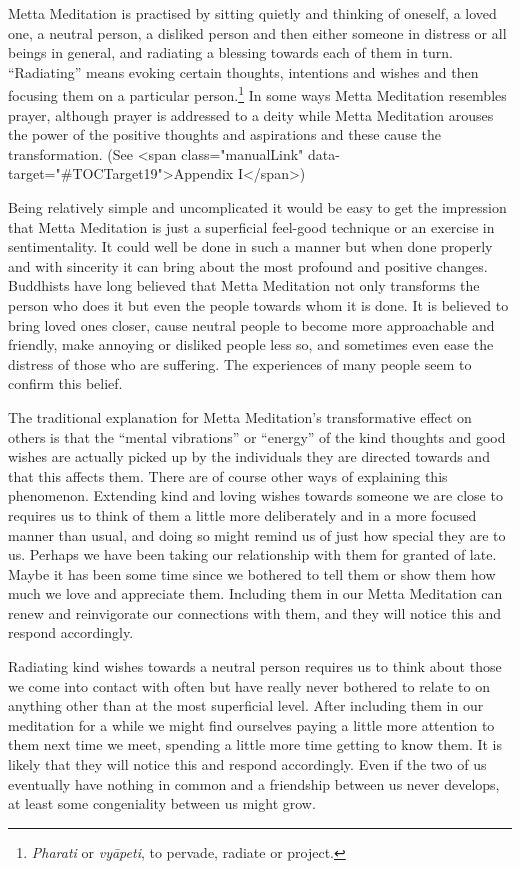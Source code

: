\documentclass[10pt, openright]{book}
\begin{document}
Metta Meditation is practised by sitting quietly and thinking of oneself, a loved one, a neutral person, a disliked person and then either someone in distress or all beings in general, and radiating a blessing towards each of them in turn. “Radiating” means evoking certain thoughts, intentions and wishes and then focusing them on a particular person.\footnote {\textit{Pharati} or \textit{vyāpeti}, to pervade, radiate or project.} In some ways Metta Meditation resembles prayer, although prayer is addressed to a deity while Metta Meditation arouses the power of the positive thoughts and aspirations and these cause the transformation. (See <span class="manualLink" data-target="#TOCTarget19">Appendix I</span>)


Being relatively simple and uncomplicated it would be easy to get the impression that Metta Meditation is just a superficial feel-good technique or an exercise in sentimentality. It could well be done in such a manner but when done properly and with sincerity it can bring about the most profound and positive changes. Buddhists have long believed that Metta Meditation not only transforms the person who does it but even the people towards whom it is done. It is believed to bring loved ones closer, cause neutral people to become more approachable and friendly, make annoying or disliked people less so, and sometimes even ease the distress of those who are suffering. The experiences of many people seem to confirm this belief.


The traditional explanation for Metta Meditation’s transformative effect on others is that the “mental vibrations” or “energy” of the kind thoughts and good wishes are actually picked up by the individuals they are directed towards and that this affects them. There are of course other ways of explaining this phenomenon. Extending kind and loving wishes towards someone we are close to requires us to think of them a little more deliberately and in a more focused manner than usual, and doing so might remind us of just how special they are to us. Perhaps we have been taking our relationship with them for granted of late. Maybe it has been some time since we bothered to tell them or show them how much we love and appreciate them. Including them in our Metta Meditation can renew and reinvigorate our connections with them, and they will notice this and respond accordingly.


Radiating kind wishes towards a neutral person requires us to think about those we come into contact with often but have really never bothered to relate to on anything other than at the most superficial level. After including them in our meditation for a while we might find ourselves paying a little more attention to them next time we meet, spending a little more time getting to know them. It is likely that they will notice this and respond accordingly. Even if the two of us eventually have nothing in common and a friendship between us never develops, at least some congeniality between us might grow.
\end{document}
